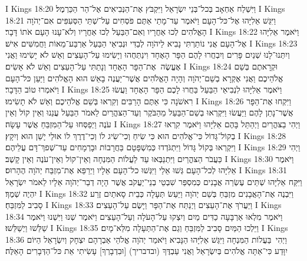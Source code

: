 I Kings 18:20	וַיִּשְׁלַח אַחְאָב בְּכל־בְּנֵי יִשְׂרָאֵל וַיִּקְבֹּץ אֶת־הַנְּבִיאִים אֶל־הַר הַכַּרְמֶל׃
I Kings 18:21	וַיִּגַּשׁ אֵלִיָּהוּ אֶל־כּל־הָעָם וַיֹּאמֶר עַד־מָתַי אַתֶּם פֹּסְחִים עַל־שְׁתֵּי הַסְּעִפִּים אִם־יְהֹוָה הָאֱלֹהִים לְכוּ אַחֲרָיו וְאִם־הַבַּעַל לְכוּ אַחֲרָיו וְלֹא־עָנוּ הָעָם אֹתוֹ דָּבָר׃
I Kings 18:22	וַיֹּאמֶר אֵלִיָּהוּ אֶל־הָעָם אֲנִי נוֹתַרְתִּי נָבִיא לַיהֹוָה לְבַדִּי וּנְבִיאֵי הַבַּעַל אַרְבַּע־מֵאוֹת וַחֲמִשִּׁים אִישׁ׃
I Kings 18:23	וְיִתְּנוּ־לָנוּ שְׁנַיִם פָּרִים וְיִבְחֲרוּ לָהֶם הַפָּר הָאֶחָד וִינַתְּחֻהוּ וְיָשִׂימוּ עַל־הָעֵצִים וְאֵשׁ לֹא יָשִׂימוּ וַאֲנִי אֶעֱשֶׂה  אֶת־הַפָּר הָאֶחָד וְנָתַתִּי עַל־הָעֵצִים וְאֵשׁ לֹא אָשִׂים׃
I Kings 18:24	וּקְרָאתֶם בְּשֵׁם אֱלֹהֵיכֶם וַאֲנִי אֶקְרָא בְשֵׁם־יְהֹוָה וְהָיָה הָאֱלֹהִים אֲשֶׁר־יַעֲנֶה בָאֵשׁ הוּא הָאֱלֹהִים וַיַּעַן כּל־הָעָם וַיֹּאמְרוּ טוֹב הַדָּבָר׃
I Kings 18:25	וַיֹּאמֶר אֵלִיָּהוּ לִנְבִיאֵי הַבַּעַל בַּחֲרוּ לָכֶם הַפָּר הָאֶחָד וַעֲשׂוּ רִאשֹׁנָה כִּי אַתֶּם הָרַבִּים וְקִרְאוּ בְּשֵׁם אֱלֹהֵיכֶם וְאֵשׁ לֹא תָשִׂימוּ׃
I Kings 18:26	וַיִּקְחוּ אֶת־הַפָּר אֲשֶׁר־נָתַן לָהֶם וַיַּעֲשׂוּ וַיִּקְרְאוּ בְשֵׁם־הַבַּעַל מֵהַבֹּקֶר וְעַד־הַצּהֳרַיִם לֵאמֹר הַבַּעַל עֲנֵנוּ וְאֵין קוֹל וְאֵין עֹנֶה וַיְפַסְּחוּ עַל־הַמִּזְבֵּחַ אֲשֶׁר עָשָׂה׃
I Kings 18:27	וַיְהִי בַצּהֳרַיִם וַיְהַתֵּל בָּהֶם אֵלִיָּהוּ וַיֹּאמֶר קִרְאוּ בְקוֹל־גָּדוֹל כִּי־אֱלֹהִים הוּא כִּי שִׂיחַ וְכִי־שִׂיג לוֹ וְכִי־דֶרֶךְ לוֹ אוּלַי יָשֵׁן הוּא וְיִקָץ׃
I Kings 18:28	וַיִּקְרְאוּ בְּקוֹל גָּדוֹל וַיִּתְגֹּדְדוּ כְּמִשְׁפָּטָם בַּחֲרָבוֹת וּבָרְמָחִים עַד־שְׁפךְ־דָּם עֲלֵיהֶם׃
I Kings 18:29	וַיְהִי כַּעֲבֹר הַצּהֳרַיִם וַיִּתְנַבְּאוּ עַד לַעֲלוֹת הַמִּנְחָה וְאֵין־קוֹל וְאֵין־עֹנֶה וְאֵין קָשֶׁב׃
I Kings 18:30	וַיֹּאמֶר אֵלִיָּהוּ לְכל־הָעָם גְּשׁוּ אֵלַי וַיִּגְּשׁוּ כל־הָעָם אֵלָיו וַיְרַפֵּא אֶת־מִזְבַּח יְהֹוָה הֶהָרוּס׃
I Kings 18:31	וַיִּקַּח אֵלִיָּהוּ שְׁתֵּים עֶשְׂרֵה אֲבָנִים כְּמִסְפַּר שִׁבְטֵי בְנֵי־יַעֲקֹב אֲשֶׁר הָיָה דְבַר־יְהֹוָה אֵלָיו לֵאמֹר יִשְׂרָאֵל יִהְיֶה שְׁמֶךָ׃
I Kings 18:32	וַיִּבְנֶה אֶת־הָאֲבָנִים מִזְבֵּחַ בְּשֵׁם יְהֹוָה וַיַּעַשׂ תְּעָלָה כְּבֵית סָאתַיִם זֶרַע סָבִיב לַמִּזְבֵּחַ׃
I Kings 18:33	וַיַּעֲרֹךְ אֶת־הָעֵצִים וַיְנַתַּח אֶת־הַפָּר וַיָּשֶׂם עַל־הָעֵצִים׃
I Kings 18:34	וַיֹּאמֶר מִלְאוּ אַרְבָּעָה כַדִּים מַיִם וְיִצְקוּ עַל־הָעֹלָה וְעַל־הָעֵצִים וַיֹּאמֶר שְׁנוּ וַיִּשְׁנוּ וַיֹּאמֶר שַׁלֵּשׁוּ וַיְשַׁלֵּשׁוּ׃
I Kings 18:35	וַיֵּלְכוּ הַמַּיִם סָבִיב לַמִּזְבֵּחַ וְגַם אֶת־הַתְּעָלָה מִלֵּא־מָיִם׃
I Kings 18:36	וַיְהִי  בַּעֲלוֹת הַמִּנְחָה וַיִּגַּשׁ אֵלִיָּהוּ הַנָּבִיא וַיֹּאמַר יְהֹוָה אֱלֹהֵי אַבְרָהָם יִצְחָק וְיִשְׂרָאֵל הַיּוֹם יִוָּדַע כִּי־אַתָּה אֱלֹהִים בְּיִשְׂרָאֵל וַאֲנִי עַבְדֶּךָ (ובדבריך) [וּבִדְבָרְךָ] עָשִׂיתִי אֵת כּל־הַדְּבָרִים הָאֵלֶּה׃
